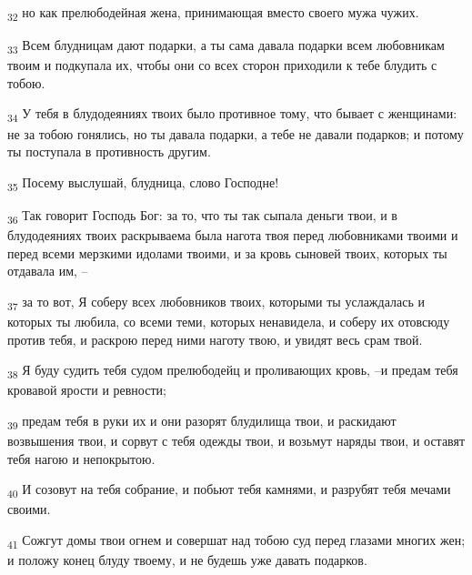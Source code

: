 \begin{tcolorbox}
\textsubscript{32} но как прелюбодейная жена, принимающая вместо своего мужа чужих.
\end{tcolorbox}
\begin{tcolorbox}
\textsubscript{33} Всем блудницам дают подарки, а ты сама давала подарки всем любовникам твоим и подкупала их, чтобы они со всех сторон приходили к тебе блудить с тобою.
\end{tcolorbox}
\begin{tcolorbox}
\textsubscript{34} У тебя в блудодеяниях твоих было противное тому, что бывает с женщинами: не за тобою гонялись, но ты давала подарки, а тебе не давали подарков; и потому ты поступала в противность другим.
\end{tcolorbox}
\begin{tcolorbox}
\textsubscript{35} Посему выслушай, блудница, слово Господне!
\end{tcolorbox}
\begin{tcolorbox}
\textsubscript{36} Так говорит Господь Бог: за то, что ты так сыпала деньги твои, и в блудодеяниях твоих раскрываема была нагота твоя перед любовниками твоими и перед всеми мерзкими идолами твоими, и за кровь сыновей твоих, которых ты отдавала им, --
\end{tcolorbox}
\begin{tcolorbox}
\textsubscript{37} за то вот, Я соберу всех любовников твоих, которыми ты услаждалась и которых ты любила, со всеми теми, которых ненавидела, и соберу их отовсюду против тебя, и раскрою перед ними наготу твою, и увидят весь срам твой.
\end{tcolorbox}
\begin{tcolorbox}
\textsubscript{38} Я буду судить тебя судом прелюбодейц и проливающих кровь, --и предам тебя кровавой ярости и ревности;
\end{tcolorbox}
\begin{tcolorbox}
\textsubscript{39} предам тебя в руки их и они разорят блудилища твои, и раскидают возвышения твои, и сорвут с тебя одежды твои, и возьмут наряды твои, и оставят тебя нагою и непокрытою.
\end{tcolorbox}
\begin{tcolorbox}
\textsubscript{40} И созовут на тебя собрание, и побьют тебя камнями, и разрубят тебя мечами своими.
\end{tcolorbox}
\begin{tcolorbox}
\textsubscript{41} Сожгут домы твои огнем и совершат над тобою суд перед глазами многих жен; и положу конец блуду твоему, и не будешь уже давать подарков.
\end{tcolorbox}
